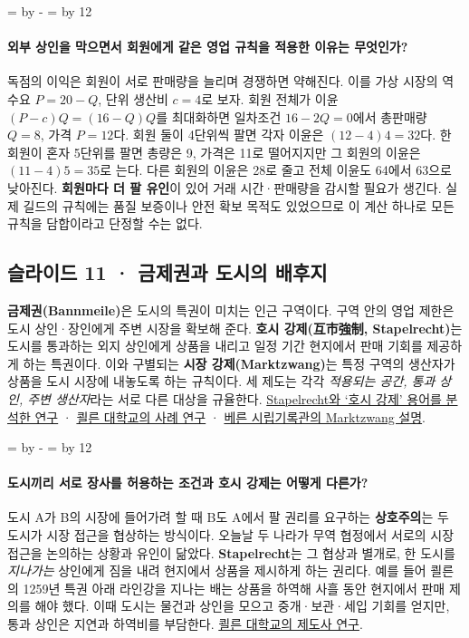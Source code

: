 \documentclass[10pt,a4paper]{article}
\newcommand{\ReserveQuestionSpace}{%
  \par\begingroup
  \dimen0=\pagegoal \advance\dimen0 by -\pagetotal
  \dimen2=\baselineskip \multiply\dimen2 by 12
  \ifdim\dimen0<\dimen2 \newpage\fi
  \endgroup}
\begin{document}
\ReserveQuestionSpace
\paragraph{외부 상인을 막으면서 회원에게 같은 영업 규칙을 적용한 이유는 무엇인가?}
독점의 이익은 회원이 서로 판매량을 늘리며 경쟁하면 약해진다. 이를 가상 시장의 역수요 $P=20-Q$, 단위 생산비 $c=4$로 보자. 회원 전체가 이윤 $(P-c)Q=(16-Q)Q$를 최대화하면 일차조건 $16-2Q=0$에서 총판매량 $Q=8$, 가격 $P=12$다. 회원 둘이 4단위씩 팔면 각자 이윤은 $(12-4)4=32$다. 한 회원이 혼자 5단위를 팔면 총량은 9, 가격은 11로 떨어지지만 그 회원의 이윤은 $(11-4)5=35$로 는다. 다른 회원의 이윤은 28로 줄고 전체 이윤도 64에서 63으로 낮아진다. \textbf{회원마다 더 팔 유인}이 있어 거래 시간·판매량을 감시할 필요가 생긴다. 실제 길드의 규칙에는 품질 보증이나 안전 확보 목적도 있었으므로 이 계산 하나로 모든 규칙을 담합이라고 단정할 수는 없다.\par

\subsection{슬라이드 11 · 금제권과 도시의 배후지}
\textbf{금제권(Bannmeile)}은 도시의 특권이 미치는 인근 구역이다. 구역 안의 영업 제한은 도시 상인·장인에게 주변 시장을 확보해 준다. \textbf{호시 강제(互市強制, Stapelrecht)}는 도시를 통과하는 외지 상인에게 상품을 내리고 일정 기간 현지에서 판매 기회를 제공하게 하는 특권이다. 이와 구별되는 \textbf{시장 강제(Marktzwang)}는 특정 구역의 생산자가 상품을 도시 시장에 내놓도록 하는 규칙이다. 세 제도는 각각 \emph{적용되는 공간, 통과 상인, 주변 생산자}라는 서로 다른 대상을 규율한다. \href{https://api.lib.kyushu-u.ac.jp/opac\_download\_md/4363594/6504\_p001.pdf}{Stapelrecht와 ‘호시 강제’ 용어를 분석한 연구} · \href{https://kups.ub.uni-koeln.de/7591/}{쾰른 대학교의 사례 연구} · \href{https://www.bern.ch/themen/stadt-recht-und-politik/informationen-im-stadtarchiv/suche-nach-themen-und-ereignissen/internetpublikation-gott-ist-burger-zu-bern/raeumliche-gliederung-des-stadtgebiets/zunft-und-gewerbeanlagen/maerkte/marktordnungen-und-marktzwang}{베른 시립기록관의 Marktzwang 설명}.\par

\ReserveQuestionSpace
\paragraph{도시끼리 서로 장사를 허용하는 조건과 호시 강제는 어떻게 다른가?}
도시 A가 B의 시장에 들어가려 할 때 B도 A에서 팔 권리를 요구하는 \textbf{상호주의}는 두 도시가 시장 접근을 협상하는 방식이다. 오늘날 두 나라가 무역 협정에서 서로의 시장 접근을 논의하는 상황과 유인이 닮았다. \textbf{Stapelrecht}는 그 협상과 별개로, 한 도시를 \emph{지나가는} 상인에게 짐을 내려 현지에서 상품을 제시하게 하는 권리다. 예를 들어 쾰른의 1259년 특권 아래 라인강을 지나는 배는 상품을 하역해 사흘 동안 현지에서 판매 제의를 해야 했다. 이때 도시는 물건과 상인을 모으고 중개·보관·세입 기회를 얻지만, 통과 상인은 지연과 하역비를 부담한다. \href{https://kups.ub.uni-koeln.de/7591/}{쾰른 대학교의 제도사 연구}.\par
\end{document}
